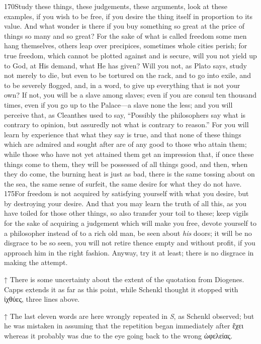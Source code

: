 170Study these things, these judgements, these arguments, look at these examples, if you wish to be free, if you desire the thing itself in proportion to its value. And what wonder is there if you buy something so great at the price of things so many and so great? For the sake of what is called freedom some men hang themselves, others leap over precipices, sometimes whole cities perish; for true freedom, which cannot be plotted against and is secure, will you not yield up to God, at His demand, what He has given? Will you not, as Plato says, study not merely to die, but even to be tortured on the rack, and to go into exile, and to be severely flogged, and, in a word, to give up everything that is not your own? If not, you will be a slave among slaves; even if you are consul ten thousand times, even if you go up to the Palace—a slave none the less; and you will perceive that, as Cleanthes used to say, ``Possibly the philosophers say what is contrary to opinion, but assuredly not what is contrary to reason.'' For you will learn by experience that what they say is true, and that none of these things which are admired and sought after are of any good to those who attain them; while those who have not yet attained them get an impression that, if once these things come to them, they will be possessed of all things good, and then, when they do come, the burning heat is just as bad, there is the same tossing about on the sea, the same sense of surfeit, the same desire for what they do not have. 175For freedom is not acquired by satisfying yourself with what you desire, but by destroying your desire. And that you may learn the truth of all this, as you have toiled for those other things, so also transfer your toil to these; keep vigils for the sake of acquiring a judgement which will make you free, devote yourself to a philosopher instead of to a rich old man, be seen about \emph{his} doors; it will be no disgrace to be so seen, you will not retire thence empty and without profit, if you approach him in the right fashion. Anyway, try it at least; there is no disgrace in making the attempt.



↑ There is some uncertainty about the extent of the quotation from Diogenes. Capps extends it as far as this point, while Schenkl thought it stopped with ἰχθύες, three lines above.

↑ The last eleven words are here wrongly repeated in \emph{S}, as Schenkl observed; but he was mistaken in assuming that the repetition began immediately after ἔχει whereas it probably was due to the eye going back to the wrong ὠφελείας.

